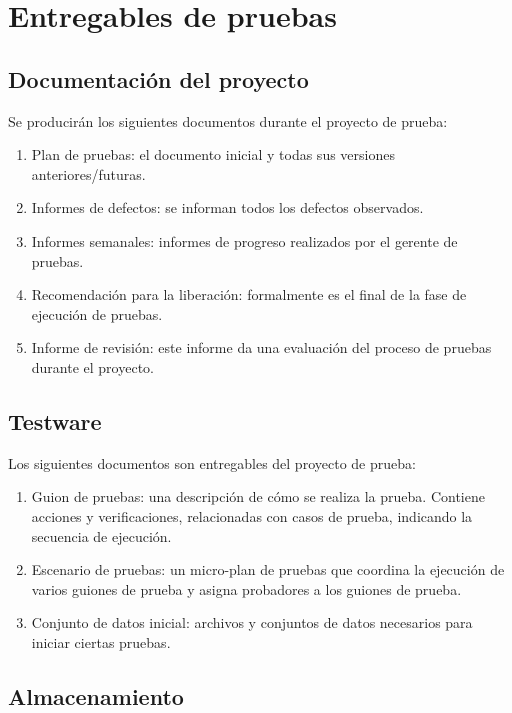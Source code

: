 \documentclass[12pt,a4paper, twoside]{article} %
\begin{document}
\section{Entregables de pruebas}

\subsection{Documentación del proyecto}

Se producirán los siguientes documentos durante el proyecto de prueba:

\begin{enumerate}
  \item Plan de pruebas: el documento inicial y todas sus versiones anteriores/futuras.
  \item Informes de defectos: se informan todos los defectos observados.
  \item Informes semanales: informes de progreso realizados por el gerente de pruebas.
  \item Recomendación para la liberación: formalmente es el final de la fase de ejecución de pruebas.
  \item Informe de revisión: este informe da una evaluación del proceso de pruebas durante el proyecto.
\end{enumerate}

\subsection{Testware}

Los siguientes documentos son entregables del proyecto de prueba:

\begin{enumerate}
  \item Guion de pruebas: una descripción de cómo se realiza la prueba. Contiene acciones y verificaciones, relacionadas con casos de prueba, indicando la secuencia de ejecución.
  \item Escenario de pruebas: un micro-plan de pruebas que coordina la ejecución de varios guiones de prueba y asigna probadores a los guiones de prueba.
  \item Conjunto de datos inicial: archivos y conjuntos de datos necesarios para iniciar ciertas pruebas.
\end{enumerate}

\subsection{Almacenamiento}
\end{document}
